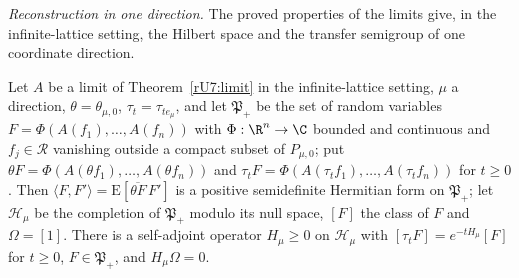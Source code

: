 \emph{Reconstruction in one direction.} The proved properties of the limits
give, in the infinite-lattice setting, the Hilbert space and the transfer
semigroup of one coordinate direction.

\begin{proposition}\label{rU7:transfer}
Let $A$ be a limit of Theorem~\textup{\ref{rU7:limit}} in the
infinite-lattice setting, $\mu$ a direction, $\theta=\theta_{\mu,0}$,
$\tau_t=\tau_{te_\mu}$, and let $\mathfrak P_+$ be the set of random
variables $F=\Phi(A(f_1),\dots,A(f_n))$ with $\Phi:\R^n\to\C$ bounded and
continuous and $f_j\in\mathcal R$ vanishing outside a compact subset of
$P_{\mu,0}$; put $\theta F=\Phi(A(\theta f_1),\dots,A(\theta f_n))$ and
$\tau_tF=\Phi(A(\tau_tf_1),\dots,A(\tau_tf_n))$ for $t\ge0$. Then
$\langle F,F'\rangle=\mathrm E[\overline{\theta F}\,F']$ is a positive
semidefinite Hermitian form on $\mathfrak P_+$; let $\mathcal H_\mu$ be the
completion of $\mathfrak P_+$ modulo its null space, $[F]$ the class of $F$
and $\Omega=[1]$. There is a self-adjoint operator $H_\mu\ge0$ on
$\mathcal H_\mu$ with $[\tau_tF]=e^{-tH_\mu}[F]$ for $t\ge0$, $F\in\mathfrak
P_+$, and $H_\mu\Omega=0$.
\end{proposition}

